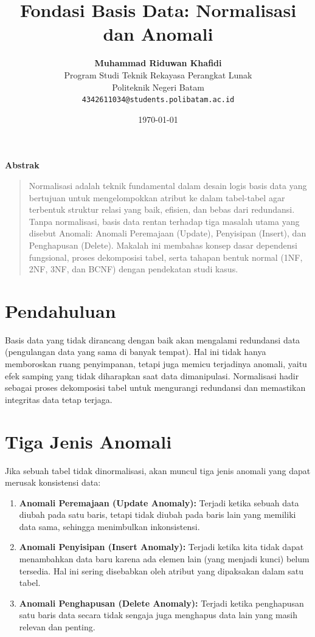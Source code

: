 \documentclass[11pt,a4paper]{article}
\title{\vspace{-1.5cm}\textbf{\sffamily\LARGE Fondasi Basis Data: Normalisasi dan Anomali}}
\author{
	\textbf{Muhammad Riduwan Khafidi} \\
	\small Program Studi Teknik Rekayasa Perangkat Lunak \\
	\small Politeknik Negeri Batam \\
	\small \texttt{4342611034@students.polibatam.ac.id}
}
\date{\small\today}
\renewenvironment{abstract}
{\small
	\begin{center}\textbf{\sffamily Abstrak}\end{center}
	\begin{quote}}
	{\end{quote}}
\begin{document}
\maketitle
\thispagestyle{empty}

\begin{abstract}
	Normalisasi adalah teknik fundamental dalam desain logis basis data yang bertujuan untuk mengelompokkan atribut ke dalam tabel-tabel agar terbentuk struktur relasi yang baik, efisien, dan bebas dari redundansi. Tanpa normalisasi, basis data rentan terhadap tiga masalah utama yang disebut Anomali: Anomali Peremajaan (Update), Penyisipan (Insert), dan Penghapusan (Delete). Makalah ini membahas konsep dasar dependensi fungsional, proses dekomposisi tabel, serta tahapan bentuk normal (1NF, 2NF, 3NF, dan BCNF) dengan pendekatan studi kasus.
\end{abstract}

\section{Pendahuluan}

Basis data yang tidak dirancang dengan baik akan mengalami redundansi data (pengulangan data yang sama di banyak tempat). Hal ini tidak hanya memboroskan ruang penyimpanan, tetapi juga memicu terjadinya anomali, yaitu efek samping yang tidak diharapkan saat data dimanipulasi. Normalisasi hadir sebagai proses dekomposisi tabel untuk mengurangi redundansi dan memastikan integritas data tetap terjaga.

\section{Tiga Jenis Anomali}

Jika sebuah tabel tidak dinormalisasi, akan muncul tiga jenis anomali yang dapat merusak konsistensi data:

\begin{enumerate}
	\item \textbf{Anomali Peremajaan (Update Anomaly):} Terjadi ketika sebuah data diubah pada satu baris, tetapi tidak diubah pada baris lain yang memiliki data sama, sehingga menimbulkan inkonsistensi.
	\item \textbf{Anomali Penyisipan (Insert Anomaly):} Terjadi ketika kita tidak dapat menambahkan data baru karena ada elemen lain (yang menjadi kunci) belum tersedia. Hal ini sering disebabkan oleh atribut yang dipaksakan dalam satu tabel.
	\item \textbf{Anomali Penghapusan (Delete Anomaly):} Terjadi ketika penghapusan satu baris data secara tidak sengaja juga menghapus data lain yang masih relevan dan penting.
\end{enumerate}
\end{document}
